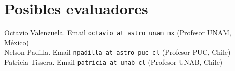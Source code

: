 \section{Posibles evaluadores}

\noindent
Octavio Valenzuela.  Email {\texttt{octavio at astro unam mx}} (Profesor UNAM, M\'exico)\\
Nelson Padilla. Email {\texttt{npadilla at astro puc cl}} (Profesor PUC, Chile)\\
Patricia Tissera. Email {\texttt{patricia at unab cl}} (Profesor UNAB, Chile)\\

